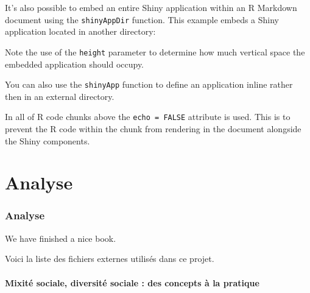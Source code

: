 \documentclass[
  french,
]{article}
\begin{document}
It's also possible to embed an entire Shiny application within an R Markdown document using the \texttt{shinyAppDir} function. This example embeds a Shiny application located in another directory:

Note the use of the \texttt{height} parameter to determine how much vertical space the embedded application should occupy.

You can also use the \texttt{shinyApp} function to define an application inline rather then in an external directory.

In all of R code chunks above the \texttt{echo\ =\ FALSE} attribute is used. This is to prevent the R code within the chunk from rendering in the document alongside the Shiny components.

\hypertarget{part-analyse}{%
\part{Analyse}\label{part-analyse}}

\hypertarget{analyse}{%
\section{Analyse}\label{analyse}}

We have finished a nice book.

Voici la liste des fichiers externes utilisés dans ce projet.

\hypertarget{mixituxe9-sociale-diversituxe9-sociale-des-concepts-uxe0-la-pratique}{%
\subsection{Mixité sociale, diversité sociale : des concepts à la pratique}\label{mixituxe9-sociale-diversituxe9-sociale-des-concepts-uxe0-la-pratique}}
\end{document}
